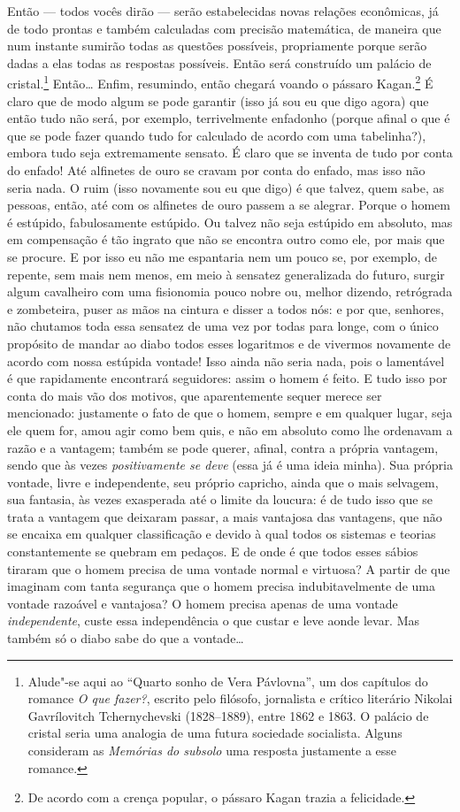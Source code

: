 Então --- todos vocês dirão --- serão estabelecidas novas relações econômicas,
já de todo prontas e também calculadas com precisão matemática, de maneira que
num instante sumirão todas as questões possíveis, propriamente porque serão
dadas a elas todas as respostas possíveis. Então será construído um palácio de
cristal.\footnote{ Alude"-se aqui ao “Quarto sonho de Vera Pávlovna”, um dos
capítulos do romance \textit{O que fazer?}, escrito pelo filósofo,
jornalista e crítico literário Nikolai Gavrílovitch Tchernychevski (1828--1889),
entre 1862 e 1863. O palácio de cristal seria uma analogia de uma futura
sociedade socialista. Alguns consideram as \textit{Memórias do subsolo} uma
resposta justamente a esse romance.} Então\ldots{} Enfim, resumindo, então
chegará voando o pássaro Kagan.\footnote{ De acordo com a crença popular, o
pássaro Kagan trazia a felicidade.} É claro que de modo algum se pode garantir
(isso já sou eu que digo agora) que então tudo não será, por exemplo,
terrivelmente enfadonho (porque afinal o que é que se pode fazer quando tudo
for calculado de acordo com uma tabelinha?), embora tudo seja extremamente
sensato. É claro que se inventa de tudo por conta do enfado! Até alfinetes de
ouro se cravam por conta do enfado, mas isso não seria nada. O ruim (isso
novamente sou eu que digo) é que talvez, quem sabe, as pessoas, então, até com
os alfinetes de ouro passem a se alegrar.  Porque o homem é estúpido,
fabulosamente estúpido. Ou talvez não seja estúpido em absoluto, mas em
compensação é tão ingrato que não se encontra outro como ele, por mais que se
procure. E por isso eu não me espantaria nem um pouco se, por exemplo, de
repente, sem mais nem menos, em meio à sensatez generalizada do futuro, surgir
algum cavalheiro com uma fisionomia pouco nobre ou, melhor dizendo, retrógrada
e zombeteira, puser as mãos na cintura e disser a todos nós: e por que,
senhores, não chutamos toda essa sensatez de uma vez por todas para longe, com
o único propósito de mandar ao diabo todos esses logaritmos e de vivermos
novamente de acordo com nossa estúpida vontade! Isso ainda não seria nada, pois
o lamentável é que rapidamente encontrará seguidores: assim o homem é feito. E
tudo isso por conta do mais vão dos motivos, que aparentemente sequer merece
ser mencionado: justamente o fato de que o homem, sempre e em qualquer lugar,
seja ele quem for, amou agir como bem quis, e não em absoluto como lhe
ordenavam a razão e a vantagem; também se pode querer, afinal, contra a própria
vantagem, sendo que às vezes \textit{positivamente se deve} (essa já é uma
ideia minha). Sua própria vontade, livre e independente, seu próprio capricho,
ainda que o mais selvagem, sua fantasia, às vezes exasperada até o limite da
loucura: é de tudo isso que se trata a vantagem que deixaram passar, a mais
vantajosa das vantagens, que não se encaixa em qualquer classificação e devido
à qual todos os sistemas e teorias constantemente se quebram em pedaços. E de
onde é que todos esses sábios tiraram que o homem precisa de uma vontade normal
e virtuosa? A partir de que imaginam com tanta segurança que o homem precisa
indubitavelmente de uma vontade razoável e vantajosa? O homem precisa apenas de
uma vontade \textit{independente}, custe essa independência o que custar e leve
aonde levar. Mas também só o diabo sabe do que a vontade\ldots{}


